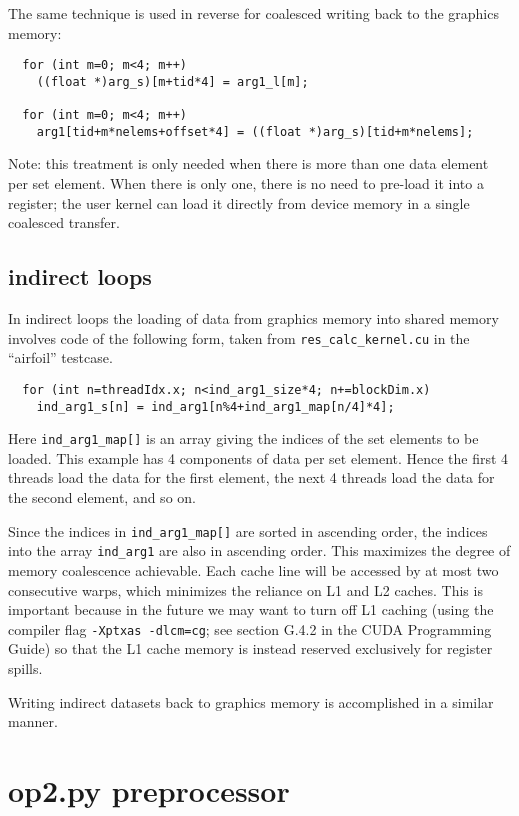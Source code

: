 \documentclass[12pt]{article}
\begin{document}
The same technique is used in reverse for coalesced writing back to the
graphics memory:
\begin{verbatim}
  for (int m=0; m<4; m++)
    ((float *)arg_s)[m+tid*4] = arg1_l[m];

  for (int m=0; m<4; m++)
    arg1[tid+m*nelems+offset*4] = ((float *)arg_s)[tid+m*nelems];
\end{verbatim}

Note: this treatment is only needed when there is more than one data element
per set element.  When there is only one, there is no need to pre-load it into
a register; the user kernel can load it directly from device memory in a
single coalesced transfer.

\newpage
\subsection{indirect loops}

In indirect loops the loading of data from graphics memory into shared
memory involves code of the following form, taken from
{\tt res\_calc\_kernel.cu} in the ``airfoil'' testcase.
\begin{verbatim}
  for (int n=threadIdx.x; n<ind_arg1_size*4; n+=blockDim.x)
    ind_arg1_s[n] = ind_arg1[n%4+ind_arg1_map[n/4]*4];
\end{verbatim}
Here \verb!ind_arg1_map[]! is an array giving the indices of the set
elements to be loaded.  This example has 4 components of data per set
element.  Hence the first 4 threads load the data for the first element,
the next 4 threads load the data for the second element, and so on.

Since the indices in \verb!ind_arg1_map[]! are sorted in ascending order,
the indices into the array \verb!ind_arg1! are also in ascending order.
This maximizes the degree of memory coalescence achievable. Each cache line
will be accessed by at most two consecutive warps, which minimizes the
reliance on L1 and L2 caches. This is important because in the future we
may want to turn off L1 caching (using the compiler flag {\tt -Xptxas -dlcm=cg};
see section G.4.2 in the CUDA Programming Guide) so that the L1 cache
memory is instead reserved exclusively for register spills.

Writing indirect datasets back to graphics memory is accomplished in a
similar manner.

\newpage

\section{op2.py preprocessor}
\end{document}
